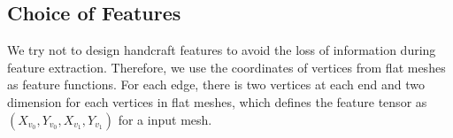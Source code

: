 \subsection{Choice of Features}
We try not to design handcraft features to avoid the loss of information during feature extraction. Therefore, we use the coordinates of vertices from flat meshes as feature functions. For each edge, there is two vertices at each end and two dimension for each vertices in flat meshes, which defines the feature tensor as $(X_{v_0},Y_{v_0},X_{v_1},Y_{v_1})$ for a input mesh.